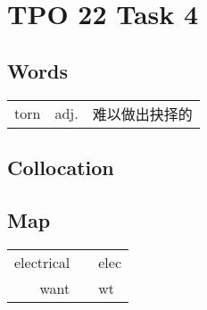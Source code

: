 \section{TPO 22 Task 4}

\subsection{Words}

\begin{tabular}{lll}
    torn & adj. & 难以做出抉择的 \\
\end{tabular}

\subsection{Collocation}

\subsection{Map}

\begin{tabular}{rc@{\quad$\to$\quad}l}
    electrical &  & elec \\
    want       &  & wt   \\
\end{tabular}
